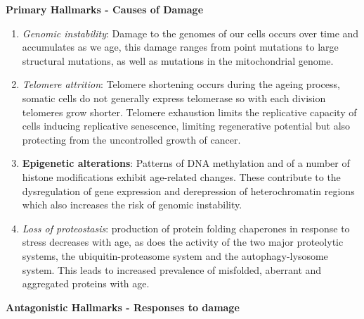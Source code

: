 \documentclass[
]{book}
\begin{document}
\textbf{Primary Hallmarks - Causes of Damage}

\begin{enumerate}
\def\labelenumi{\arabic{enumi}.}
\item
  \emph{Genomic instability}:
  Damage to the genomes of our cells occurs over time and accumulates as we age, this damage ranges from point mutations to large structural mutations, as well as mutations in the mitochondrial genome.
\item
  \emph{Telomere attrition}:
  Telomere shortening occurs during the ageing process, somatic cells do not generally express telomerase so with each division telomeres grow shorter.
  Telomere exhaustion limits the replicative capacity of cells inducing replicative senescence, limiting regenerative potential but also protecting from the uncontrolled growth of cancer.
\item
  \textbf{Epigenetic alterations}:
  Patterns of DNA methylation and of a number of histone modifications exhibit age-related changes. These contribute to the dysregulation of gene expression and derepression of heterochromatin regions which also increases the risk of genomic instability.
\item
  \emph{Loss of proteostasis}:
  production of protein folding chaperones in response to stress decreases with age, as does the activity of the two major proteolytic systems, the ubiquitin-proteasome system and the autophagy-lysosome system.
  This leads to increased prevalence of misfolded, aberrant and aggregated proteins with age.
\end{enumerate}

\textbf{Antagonistic Hallmarks - Responses to damage}
\end{document}
